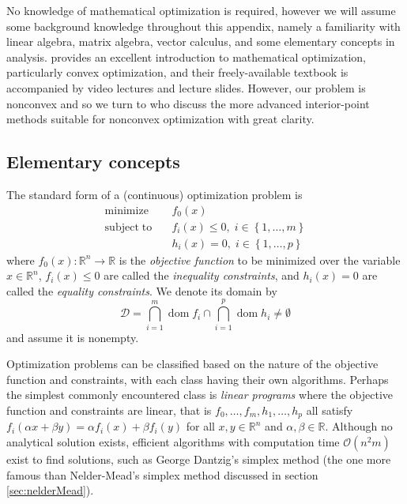 No knowledge of mathematical optimization is required, however we will assume some background knowledge throughout this appendix, namely a familiarity with linear algebra, matrix algebra, vector calculus, and some elementary concepts in analysis. \citet{Boyd04} provides an excellent introduction to mathematical optimization, particularly convex optimization, and their freely-available textbook is accompanied by video lectures and lecture slides. However, our problem is nonconvex and so we turn to \citet{Nocedal06} who discuss the more advanced interior-point methods suitable for nonconvex optimization with great clarity.

\subsection{Elementary concepts}
The standard form of a (continuous) optimization problem is
\begin{align} \label{eq:op}
\mathrm{minimize}   \quad & f_0(x) \nonumber \\
\mathrm{subject\;to} \quad &
f_i(x) \leq 0, \; i \in \left\{1, \dots, m \right\}\\
& h_i(x) = 0, \; i \in \left\{1, \dots, p \right\} \nonumber
\end{align}
where $f_0(x): \mathbb{R}^n \rightarrow \mathbb{R}$ is the \emph{objective function} to be minimized over the variable $x \in \mathbb{R}^n$, $f_i(x) \leq 0$ are called the \emph{inequality constraints}, and $h_i(x) = 0$ are called the \emph{equality constraints}. We denote its domain by
\begin{equation}
\mathcal{D} = \bigcap_{i=1}^m \operatorname{dom} f_i \cap \bigcap_{i=1}^p \operatorname{dom} h_i \neq \emptyset
\end{equation}
and assume it is nonempty.

Optimization problems can be classified based on the nature of the objective function and constraints, with each class having their own algorithms. Perhaps the simplest commonly encountered class is \emph{linear programs} where the objective function and constraints are linear, that is $f_0, \dots, f_m, h_1, \dots, h_p$ all satisfy $f_i(\alpha x + \beta y) = \alpha f_i(x) + \beta f_i(y)$ for all $x,y \in \mathbb{R}^n$ and $\alpha, \beta \in \mathbb{R}$. Although no analytical solution exists, efficient algorithms with computation time $\mathcal{O}(n^2m)$ exist to find solutions, such as George Dantzig's simplex method (the one more famous than Nelder-Mead's simplex method discussed in section \ref{sec:nelderMead}).

